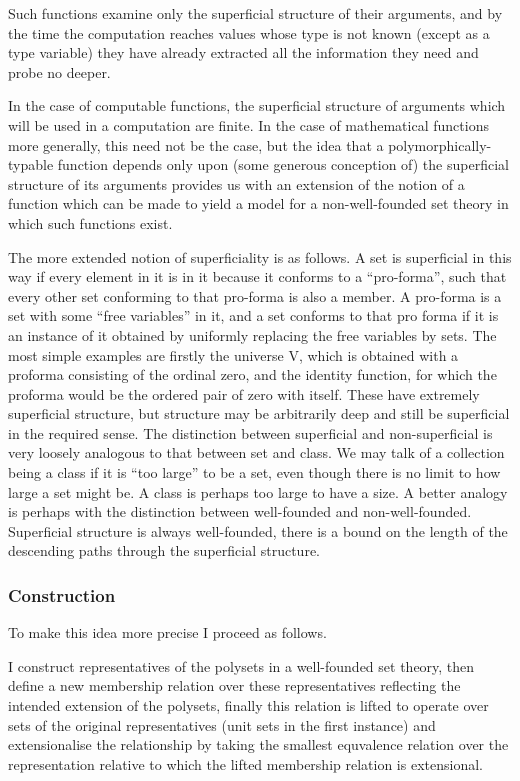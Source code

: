 \documentclass[numreferences]{rbjk}
\begin{document}
\begin{article}
Such functions examine only the superficial structure of their arguments, and by the time the computation reaches values whose type is not known (except as a type variable) they have already extracted all the information they need and probe no deeper.

In the case of computable functions, the superficial structure of arguments which will be used in a computation are finite.
In the case of mathematical functions more generally, this need not be the case, but the idea that a polymorphically-typable function depends only upon (some generous conception of) the superficial structure of its arguments provides us with an extension of the notion of a function which can be made to yield a model for a non-well-founded set theory in which such functions exist.

The more extended notion of superficiality is as follows.
A set is superficial in this way if every element in it is in it because it conforms to a ``pro-forma'', such that every other set conforming to that pro-forma is also a member.
A pro-forma is a set with some ``free variables'' in it, and a set conforms to that pro forma if it is an instance of it obtained by uniformly replacing the free variables by sets.
The most simple examples are firstly the universe V, which is obtained with a proforma consisting of the ordinal zero, and the identity function, for which the proforma would be the ordered pair of zero with itself.
These have extremely superficial structure, but structure may be arbitrarily deep and still be superficial in the required sense.
The distinction between superficial and non-superficial is very loosely analogous to that between set and class.
We may talk of a collection being a class if it is ``too large'' to be a set, even though there is no limit to how large a set might be.
A class is perhaps too large to have a size.
A better analogy is perhaps with the distinction between well-founded and non-well-founded.
Superficial structure is always well-founded, there is a bound on the length of the descending paths through the superficial structure.

\subsubsection{Construction}
To make this idea more precise I proceed as follows.

I construct representatives of the polysets in a well-founded set theory, then define a new membership relation over these representatives reflecting the intended extension of the polysets, finally this relation is lifted to operate over sets of the original representatives (unit sets in the first instance) and extensionalise the relationship by taking the smallest equvalence relation over the representation relative to which the lifted membership relation is extensional.


\end{article}
\end{document}
